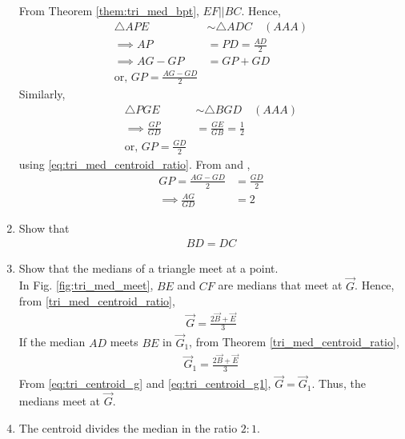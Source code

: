 \begin{enumerate}[label=\arabic*.,ref=\thesubsection.\theenumi]
\solution  From Theorem \ref{them:tri_med_bpt}, $ EF || BC$.  Hence,
%
\begin{align}
\triangle APE &\sim \triangle ADC \quad (AAA)
\\
\implies AP &= PD = \frac{AD}{2}
\\
\implies  AG - GP &= GP + GD 
\\
\text{or, }  GP=\frac{AG - GD}{2} 
\label{eq:tri_med_centroid_ratio_AD1}
\end{align}
%
Similarly, 
%
\begin{align}
\triangle PGE &\sim \triangle BGD  \quad (AAA)
\\
\implies \frac{GP}{GD} &= \frac{GE}{GB} = \frac{1}{2}
\\
\text{or, }  GP=\frac{GD}{2} 
\label{eq:tri_med_centroid_ratio_AD2}
\end{align}
using \eqref{eq:tri_med_centroid_ratio}. From \label{eq:tri_med_centroid_ratio_AD1}
and \label{eq:tri_med_centroid_ratio_AD2},
%
\begin{align}
GP=\frac{AG - GD}{2} &=\frac{GD}{2}  
\\
\implies  \frac{AG}{GD} &=2
\end{align}
\item Show that 
%
\begin{align}
BD = DC
\end{align}
\item Show that the medians of a triangle meet at a point.
\\
\solution In Fig. \ref{fig:tri_med_meet}, $BE$ and $CF$	are medians that meet at $\vec{G}$.  Hence, 
from \eqref{tri_med_centroid_ratio}, 
%
\begin{align}
\label{eq:tri_centroid_g}
\vec{G} = \frac{2\vec{B}+\vec{E}}{3}
\end{align}
%
If the median $AD$ meets $BE$ in $\vec{G}_1$, from Theorem \eqref{tri_med_centroid_ratio}, 
%
\begin{align}
\vec{G}_1 = \frac{2\vec{B}+\vec{E}}{3}
\label{eq:tri_centroid_g1}
\end{align}
%
From  \eqref{eq:tri_centroid_g}
 and \eqref{eq:tri_centroid_g1}, $\vec{G} = \vec{G}_1$.  Thus, the medians meet at $\vec{G}$.
\item The centroid divides the median in the ratio $2:1$.
\label{them:tri_med_ratio}




\end{enumerate}
